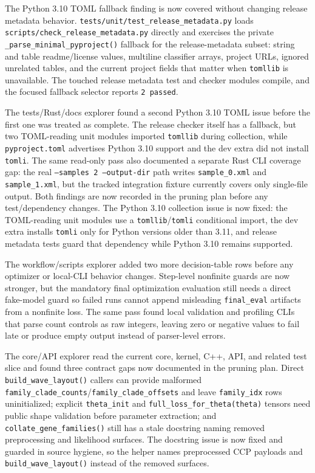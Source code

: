 \documentclass[11pt]{article}
\begin{document}
The Python 3.10 TOML fallback finding is now covered without changing release
metadata behavior.  \texttt{tests/unit/test\_release\_metadata.py} loads
\texttt{scripts/check\_release\_metadata.py} directly and exercises the private
\texttt{\_parse\_minimal\_pyproject()} fallback for the release-metadata subset:
string and table readme/license values, multiline classifier arrays, project
URLs, ignored unrelated tables, and the current project fields that matter when
\texttt{tomllib} is unavailable.  The touched release metadata test and checker
modules compile, and the focused fallback selector reports \texttt{2 passed}.

The tests/Rust/docs explorer found a second Python 3.10 TOML issue before the
first one was treated as complete.  The release checker itself has a fallback,
but two TOML-reading unit modules imported \texttt{tomllib} during collection,
while \texttt{pyproject.toml} advertises Python 3.10 support and the dev extra
did not install \texttt{tomli}.  The same read-only pass also documented a
separate Rust CLI coverage gap: the real \texttt{--samples 2 --output-dir}
path writes \texttt{sample\_0.xml} and \texttt{sample\_1.xml}, but the tracked
integration fixture currently covers only single-file output.  Both findings
are now recorded in the pruning plan before any test/dependency changes.
The Python 3.10 collection issue is now fixed: the TOML-reading unit modules use
a \texttt{tomllib}/\texttt{tomli} conditional import, the dev extra installs
\texttt{tomli} only for Python versions older than 3.11, and release metadata
tests guard that dependency while Python 3.10 remains supported.

The workflow/scripts explorer added two more decision-table rows before any
optimizer or local-CLI behavior changes.  Step-level nonfinite guards are now
stronger, but the mandatory final optimization evaluation still needs a direct
fake-model guard so failed runs cannot append misleading \texttt{final\_eval}
artifacts from a nonfinite loss.  The same pass found local validation and
profiling CLIs that parse count controls as raw integers, leaving zero or
negative values to fail late or produce empty output instead of parser-level
errors.

The core/API explorer read the current core, kernel, C++, API, and related test
slice and found three contract gaps now documented in the pruning plan.  Direct
\texttt{build\_wave\_layout()} callers can provide malformed
\texttt{family\_clade\_counts}/\texttt{family\_clade\_offsets} and leave
\texttt{family\_idx} rows uninitialized; explicit \texttt{theta\_init} and
\texttt{full\_loss\_for\_theta(theta)} tensors need public shape validation
before parameter extraction; and \texttt{collate\_gene\_families()} still has a
stale docstring naming removed preprocessing and likelihood surfaces.  The
docstring issue is now fixed and guarded in source hygiene, so the helper names
preprocessed CCP payloads and \texttt{build\_wave\_layout()} instead of the
removed surfaces.
\end{document}
